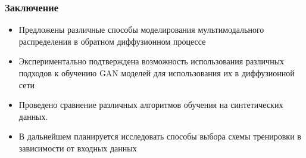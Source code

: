 \documentclass[8pt]{beamer}
\newcommand\FontUP{\fontsize{10}{12}\selectfont}
\begin{document}
\begin{frame}
	\frametitle{Заключение}
	\FontUP
		\begin{itemize}
			\item Предложены различные способы моделирования мультимодального распределения в обратном диффузионном процессе
			\vfill
			\item Экспериментально подтверждена возможность использования различных подходов к обучению GAN моделей для использования их в диффузионной сети
			\vfill
			\item Проведено сравнение различных алгоритмов обучения на синтетических данных.
			\vfill
			\item В дальнейшем планируется исследовать способы выбора схемы тренировки в зависимости от входных данных
		\end{itemize}		
\end{frame}
\end{document}
